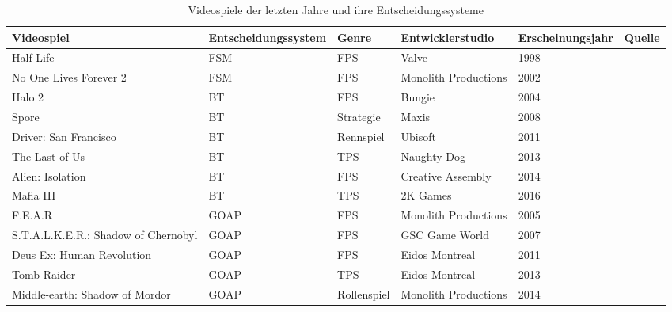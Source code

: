 \begin{sidewaystable}[h]
	\caption{Videospiele der letzten Jahre und ihre Entscheidungssysteme}
  \label{tab:videospiele}
  \renewcommand{\arraystretch}{1.2}
  \centering
  \small
    \begin{tabularx}{0.95\textwidth}{l l x x x x}
			\toprule
      \textbf{Videospiel} & \textbf{Entscheidungssystem} & \textbf{Genre} & \textbf{Entwicklerstudio} & \textbf{Erscheinungsjahr} & \textbf{Quelle} \\
			\midrule
			Half-Life & FSM & FPS & Valve & 1998 & \autocite{halflife} \\
			No One Lives Forever 2 & FSM & FPS & Monolith Productions & 2002 & \autocite{fear} \\
			Halo 2 & BT & FPS & Bungie & 2004 & \autocite{aiag} \\
			Spore & BT & Strategie & Maxis & 2008 & \autocite{spore} \\
			Driver: San Francisco & BT & Rennspiel & Ubisoft & 2011 & \autocite{Ocio2021} \\
			The Last of Us & BT & TPS & Naughty Dog & 2013 & \autocite{panwar2022npcaiuscase} \\
			Alien: Isolation & BT & FPS & Creative Assembly & 2014 & \autocite{vsvelch2020should} \\
			Mafia III & BT & TPS & 2K Games & 2016 & \autocite{holba2021open} \\
			F.E.A.R & GOAP & FPS & Monolith Productions & 2005 & \autocite{fear} \\
      S.T.A.L.K.E.R.: Shadow of Chernobyl & GOAP & FPS & GSC Game World & 2007 & \autocite{sielicki2018adaptation} \\
      Deus Ex: Human Revolution & GOAP & FPS & Eidos Montreal & 2011 & \autocite{sielicki2018adaptation} \\
			Tomb Raider & GOAP & TPS & Eidos Montreal & 2013 & \autocite{goap_gdc} \\
      Middle-earth: Shadow of Mordor & GOAP & Rollenspiel & Monolith Productions & 2014 & \autocite{goap_gdc} \\
      \bottomrule
    \end{tabularx}
\end{sidewaystable}
